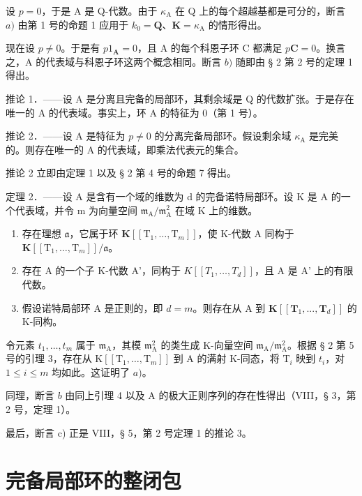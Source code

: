 设 \(p = 0\)，于是 A 是 Q-代数。由于 \(\kappa_{\mathrm{A}}\) 在 Q 上的每个超越基都是可分的，断言 \(a)\) 由第 1 号的命题 1 应用于 \(k_0 = \mathbf{Q}\)、\(\mathbf{K} = \kappa_{\mathrm{A}}\) 的情形得出。

现在设 \(p \neq 0\)。于是有 \(p1_{\mathbf{A}} = 0\)，且 A 的每个科恩子环 C 都满足 \(p\mathbf{C} = 0\)。换言之，A 的代表域与科恩子环这两个概念相同。断言 \(b)\) 随即由 § 2 第 2 号的定理 1 得出。

推论 1．——设 A 是分离且完备的局部环，其剩余域是 Q 的代数扩张。于是存在唯一的 A 的代表域。事实上，环 A 的特征为 0（第 1 号）。

推论 2．——设 A 是特征为 \(p \neq 0\) 的分离完备局部环。假设剩余域 \(\kappa_{\mathrm{A}}\) 是完美的。则存在唯一的 A 的代表域，即乘法代表元的集合。

推论 2 立即由定理 1 以及 § 2 第 4 号的命题 7 得出。

定理 2．——设 A 是含有一个域的维数为 d 的完备诺特局部环。设 K 是 A 的一个代表域，并令 m 为向量空间 \(\mathfrak{m}_{\mathrm{A}} / \mathfrak{m}_{\mathrm{A}}^{2}\) 在域 K 上的维数。

\begin{enumerate}
\def\labelenumi{\alph{enumi})}
\item
  存在理想 \(\mathfrak{a}\)，它属于环 \(\mathbf{K}[[\mathrm{T}_1,\dots,\mathrm{T}_m]]\)，使 K-代数 A 同构于 \(\mathbf{K}[[\mathrm{T}_1,\dots,\mathrm{T}_m]] / \mathfrak{a}\)。
\item
  存在 A 的一个子 K-代数 A'，同构于 \(K[[T_{1}, \ldots, T_{d}]]\)，且 A 是 A' 上的有限代数。
\item
  假设诺特局部环 A 是正则的，即 \(d = m\)。则存在从 A 到 \(\mathbf{K}[[\mathbf{T}_1, ..., \mathbf{T}_d]]\) 的 K-同构。
\end{enumerate}

令元素 \(t_{1},\ldots,t_{m}\) 属于 \(\mathfrak{m}_{\mathrm{A}}\)，其模 \(\mathfrak{m}_{\mathrm{A}}^{2}\) 的类生成 K-向量空间 \(\mathfrak{m}_{\mathrm{A}}/\mathfrak{m}_{\mathrm{A}}^{2}\)。根据 § 2 第 5 号的引理 3，存在从 \(\mathrm{K}[[\mathrm{T}_{1},\ldots,\mathrm{T}_{m}]]\) 到 A 的满射 K-同态，将 \(\mathrm{T}_{i}\) 映到 \(t_{i}\)，对 \(1\leqslant i\leqslant m\) 均如此。这证明了 \(a)\)。

同理，断言 \(b\) 由同上引理 4 以及 A 的极大正则序列的存在性得出（VIII，§ 3，第 2 号，定理 1）。

最后，断言 c) 正是 VIII，§ 5，第 2 号定理 1 的推论 3。

\section{完备局部环的整闭包}

